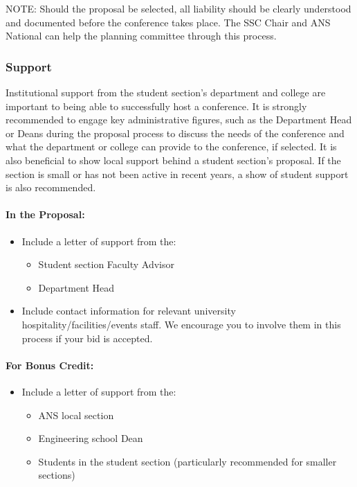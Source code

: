 \documentclass[12pt]{article}
\begin{document}
NOTE: Should the proposal be selected, all liability should be clearly understood and documented before the conference takes place. The SSC Chair and ANS National can help the planning committee through this process.

\subsubsection{Support}
Institutional support from the student section's department and college are important to being able to successfully host a conference.
It is strongly recommended to engage key administrative figures, such as the Department Head or Deans during the proposal process to discuss the needs of the conference and what the department or college can provide to the conference, if selected.
It is also beneficial to show local support behind a student section’s proposal.
If the section is small or has not been active in recent years, a show of student support is also
recommended.

\paragraph{In the Proposal:}
\begin{itemize}
\item Include a letter of support from the:
\begin{itemize}
\item{Student section Faculty Advisor}
\item{Department Head}
\end{itemize}
\item{Include contact information for relevant university hospitality/facilities/events staff. We encourage you to involve them in this process if your bid is accepted.}
\end{itemize}

\paragraph{For Bonus Credit:}
\begin{itemize}
\item{Include a letter of support from the:
\begin{itemize}
\item{ANS local section}
\item{Engineering school Dean}
\item{Students in the student section (particularly recommended for smaller sections)}
\end{itemize}
}
\end{itemize}
\end{document}
